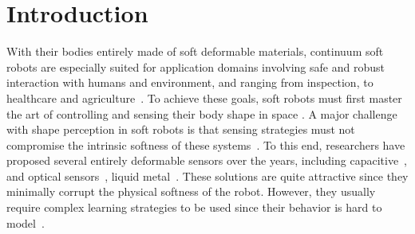 \section{Introduction}\label{sec:srslam:introduction}
%
With their bodies entirely made of soft deformable materials, continuum soft robots are especially suited for application domains involving safe and robust interaction with humans and environment, and ranging from inspection, to healthcare and agriculture~\cite{majidi2014soft,elfferich2021soft}. To achieve these goals, soft robots must first master the art of controlling and sensing their body shape in space \cite{della2023model}.
%
%
%
A major challenge with shape perception in soft robots is that sensing strategies must not compromise the intrinsic softness of these systems~\cite{polygerinos2017soft,wang2018toward}. %
%
To this end, researchers have proposed several entirely deformable sensors over the years, including capacitive~\cite{scimeca2019model},  and optical sensors~\cite{li2021scaling}, liquid metal~\cite{wall2017method}. These solutions are quite attractive since they minimally corrupt the physical softness of the robot. However, they usually require complex learning strategies to be used since their behavior is hard to model~\cite{thuruthel2019soft,truby2020distributed}.
%

